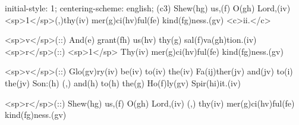 initial-style: 1;
centering-scheme: english;
(c3) Shew(hg) us,(f) O(gh) Lord,(iv) <sp>1</sp>(,)thy(iv) mer(g)ci(hv)ful(fe) kind(fg)ness.(gv) <c>ii.</c>

<sp>v</sp>(::) And(e) grant(fh) us(hv) thy(g) sal(f)va(gh)tion.(iv) <sp>r</sp>(::) <sp>1</sp> Thy(iv) mer(g)ci(hv)ful(fe) kind(fg)ness.(gv)

<sp>v</sp>(::) Glo(gv)ry(iv) be(iv) to(iv) the(iv) Fa(ij)ther(jv) and(jv) to(i) the(jv) Son:(h) (,) and(h) to(h) the(g) Ho(f)ly(gv) Spir(hi)it.(iv)

<sp>r</sp>(::)  Shew(hg) us,(f) O(gh) Lord,(iv) (,) thy(iv) mer(g)ci(hv)ful(fe) kind(fg)ness.(gv)